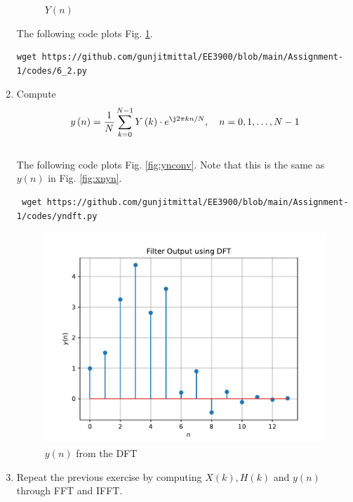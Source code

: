 \documentclass[journal,12pt,twocolumn]{IEEEtran}
\renewcommand\thesection{\arabic{section}}
\begin{document}
\begin{enumerate}[label=\thesection.\arabic*]
\begin{figure}[!ht]
  \caption{$Y(n)$}
  \label{fig:Y(n)}
  \end{figure}
  The following code plots Fig. \ref{fig:Y(n)}.
%
\begin{lstlisting}
wget https://github.com/gunjitmittal/EE3900/blob/main/Assignment-1/codes/6_2.py
\end{lstlisting}
\item Compute
\begin{equation}
  y\brak{n}={\frac {1}{N}}\sum _{k=0}^{N-1}Y\brak{k}\cdot e^{\j 2\pi kn/N},\quad n = 0,1,\dots, N-1
  \label{eq:inv-ft}
 \end{equation}
 \\
 \solution The following code plots Fig. \ref{fig:ynconv}. Note that this is the same as 
 $y(n)$ in  Fig. 
 \ref{fig:xnyn}. 
 \begin{lstlisting}
 wget https://github.com/gunjitmittal/EE3900/blob/main/Assignment-1/codes/yndft.py
 \end{lstlisting}
 \begin{figure}[!ht]
 \centering
 \includegraphics[width=\columnwidth]{./figs/yndft}
 \caption{$y(n)$ from the DFT}
 \label{fig:yndft}
 \end{figure}
 \item Repeat the previous exercise by computing $X(k), H(k)$ and $y(n)$ through FFT and 
 IFFT.\\
 \solution
 \begin{figure}[!ht]
  \centering

\end{figure}
\end{enumerate}
\end{document}

